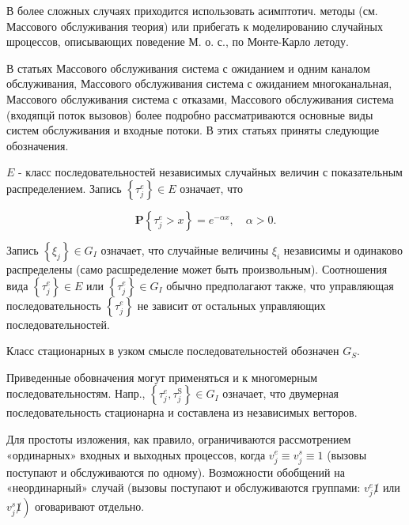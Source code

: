 \documentclass[10pt]{article}
\begin{document}
В более сложных случаях приходится использовать асимптотич. методы (см. Массового обслуживания теория) или прибегать к моделированию случайных шроцессов, описывающих поведение М. о. с., по Монте-Карло летоду.



В статьях Массового обслуживания система с ожиданием и одним каналом обслуживания, Массового обслуживания система с ожиданием многоканальная, Массового обслуживания система с отказами, Массового обслуживания система (входяпцй поток вызовов) более подробно рассматриваются основные виды систем обслуживания и входные потоки. В этих статьях приняты следующие обозначения.



$E$ - класс последовательностей независимых случайных величин с показательным распределением. Запись $\left\{\tau_{j}^{e}\right\} \in E$ означает, что



\[

\mathbf{P}\left\{\tau_{j}^{e}>x\right\}=e^{-\alpha x}, \quad \alpha>0 .

\]



Запись $\left\{\xi_{j}\right\} \in G_{I}$ означает, что случайные величины $\xi_{i}$ независимы и одинаково распределены (само расшределение может быть произвольным). Соотношения вида $\left\{\tau_{j}^{e}\right\} \in E$ или $\left\{\tau_{j}^{e}\right\} \in G_{I}$ обычно предполагают также, что управляющая последовательность $\left\{\tau_{j}^{e}\right\}$ не зависит от остальных управляющих последовательностей.



Класс стационарных в узком смысле последовательностей обозначен $G_{S}$.



Приведенные обовначения могут применяться и к многомерным последовательностям. Напр., $\left\{\tau_{j}^{e}, \tau_{j}^{\mathrm{S}}\right\} \in G_{I}$ означает, что двумерная последовательность стационарна и составлена из независимых вегторов.



Для простоты изложения, как правило, ограничиваются рассмотрением «ординарных» входных и выходных процессов, когда $v_{j}^{e} \equiv v_{j}^{s} \equiv 1$ (вызовы поступают и обслуживаются по одному). Возможности обобщений на «неординарный» случай (вызовы поступают и обслуживаются группами: $v_{j}^{e} \not 1$ или $\left.v_{j}^{s} \not 1\right)$ оговаривают отдельно.
\end{document}

